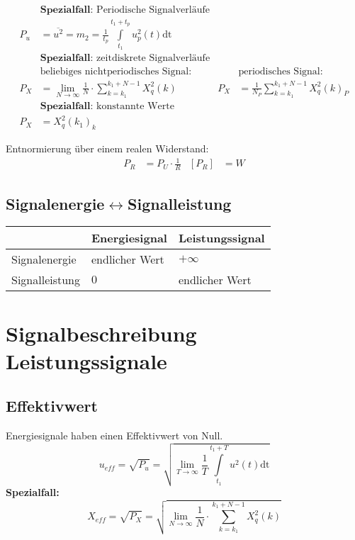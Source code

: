 \begin{align*}
	&\textbf{Spezialfall: } \text{Periodische Signalverläufe}
	\\
	P_u &= \overline{u^2} = m_2 = \frac{1}{t_p} \int\limits_{t_1}^{t_1 + t_p}u^2_p\left(t\right)
	\mathrm{dt}
	\\
&\textbf{Spezialfall: } \text{zeitdiskrete Signalverläufe}
	\\
	&\text{beliebiges nichtperiodisches Signal:} & &\text{periodisches Signal:}
	\\
	P_X &= \lim\limits_{N \to \infty} \frac{1}{N} \cdot \sum\limits_{k = k_1}^{k_1 +
	N - 1} X_q^2\left(k\right) &
	P_X &= \frac{1}{N_P} \sum\limits_{k = k_1}^{k_1 + N - 1}X_q^2\left(k\right)_P
	\\
&\textbf{Spezialfall: } \text{konstannte Werte}
	\\
	P_X &= X^2_q\left(k_1\right)_k
\end{align*}

Entnormierung über einem realen Widerstand:
\begin{align*}
	P_R &= P_U \cdot \frac{1}{R} & \left[P_R\right] &= W
\end{align*}

\subsection*{Signalenergie\texorpdfstring{$\leftrightarrow$}/Signalleistung}
\begin{tabularx}{\textwidth}{|X|X|X|}\hline
					& Energiesignal 	& Leistungssignal	\\ \hline
	Signalenergie	& endlicher Wert	& \(+\infty\)		\\ \hline
	Signalleistung	& \(0\)				& endlicher Wert	\\ \hline
\end{tabularx}

\section{Signalbeschreibung Leistungssignale}
\subsection*{Effektivwert}
Energiesignale haben einen Effektivwert von Null.
\[
u_{eff} = \sqrt{P_u} = \sqrt{\lim\limits_{T \to \infty} \frac{1}{T} \int\limits_{t_1}^{t_1 +
	T}u^2\left(t\right) \mathrm{dt}}
\]
\textbf{Spezialfall: } 
\[
X_{eff} = \sqrt{P_X} = \sqrt{\lim\limits_{N \to \infty} \frac{1}{N} \cdot \sum\limits_{k = k_1}^{k_1 +
	N - 1} X_q^2\left(k\right)}
\]

